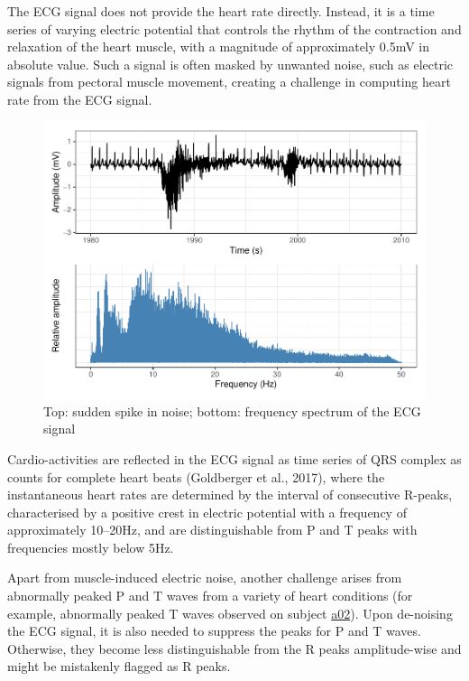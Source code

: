 \documentclass[
]{article}
\begin{document}
The ECG signal does not provide the heart rate directly. Instead, it is
a time series of varying electric potential that controls the rhythm of
the contraction and relaxation of the heart muscle, with a magnitude of
approximately 0.5mV in absolute value. Such a signal is often masked by
unwanted noise, such as electric signals from pectoral muscle movement,
creating a challenge in computing heart rate from the ECG signal.

\begin{figure}

{\centering \includegraphics{report_files/figure-latex/ecg-noise-1} 

}

\caption{Top: sudden spike in noise; bottom: frequency spectrum of the ECG signal}\label{fig:ecg-noise}
\end{figure}

Cardio-activities are reflected in the ECG signal as time series of QRS
complex as counts for complete heart beats (Goldberger et al., 2017),
where the instantaneous heart rates are determined by the interval of
consecutive R-peaks, characterised by a positive crest in electric
potential with a frequency of approximately 10--20Hz, and are
distinguishable from P and T peaks with frequencies mostly below 5Hz.

Apart from muscle-induced electric noise, another challenge arises from
abnormally peaked P and T waves from a variety of heart conditions (for
example, abnormally peaked T waves observed on subject
\protect\hyperlink{visual}{a02}). Upon de-noising the ECG signal, it is
also needed to suppress the peaks for P and T waves. Otherwise, they
become less distinguishable from the R peaks amplitude-wise and might be
mistakenly flagged as R peaks.
\end{document}
